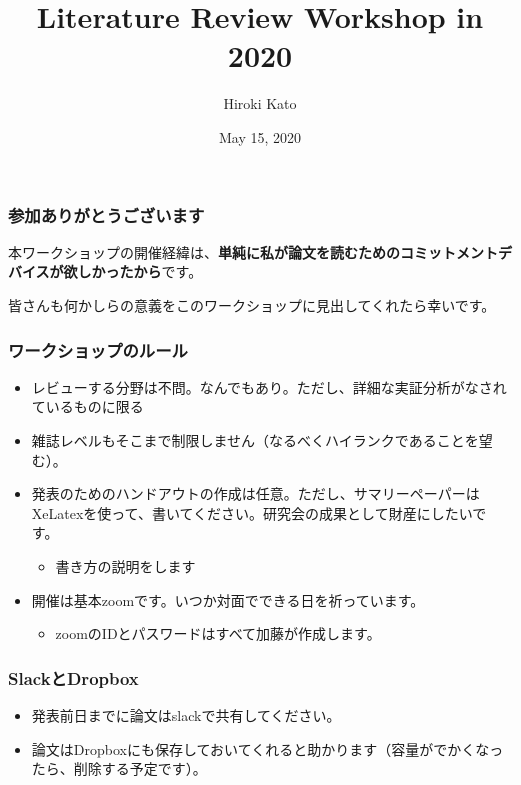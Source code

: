 \documentclass[unicode,12pt]{beamer}
\title{Literature Review Workshop in 2020}
\subtitle{}
\author{Hiroki Kato}
\date{May 15, 2020}
\begin{document}
    \maketitle

    \begin{frame}
        \frametitle{参加ありがとうございます}
    
        本ワークショップの開催経緯は、\textbf{単純に私が論文を読むためのコミットメントデバイスが欲しかったから}です。
        
        皆さんも何かしらの意義をこのワークショップに見出してくれたら幸いです。
    
    \end{frame}

    \begin{frame}
        \frametitle{ワークショップのルール}
    
        \begin{itemize}
            \item レビューする分野は不問。なんでもあり。ただし、詳細な実証分析がなされているものに限る
            \item 雑誌レベルもそこまで制限しません（なるべくハイランクであることを望む）。
            \item 発表のためのハンドアウトの作成は任意。ただし、サマリーペーパーはXeLatexを使って、書いてください。研究会の成果として財産にしたいです。
            \begin{itemize}
                \item 書き方の説明をします
            \end{itemize}
            \item 開催は基本zoomです。いつか対面でできる日を祈っています。
            \begin{itemize}
                \item zoomのIDとパスワードはすべて加藤が作成します。
            \end{itemize}
        \end{itemize}
    
    \end{frame}

    \begin{frame}
        \frametitle{SlackとDropbox}
    
        \begin{itemize}
            \item 発表前日までに論文はslackで共有してください。
            \item 論文はDropboxにも保存しておいてくれると助かります（容量がでかくなったら、削除する予定です）。
        \end{itemize}
    
    \end{frame}
\end{document}
